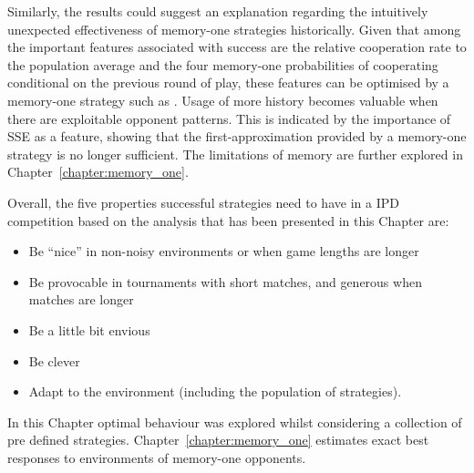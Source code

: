 Similarly, the results could suggest an explanation regarding the intuitively
unexpected effectiveness of memory-one strategies historically. Given that among
the important features associated with success are the relative cooperation rate
to the population average and the four memory-one probabilities of cooperating
conditional on the previous round of play, these features can be optimised by a
memory-one strategy such as \TitForTat. Usage of more history becomes valuable when
there are exploitable opponent patterns. This is indicated by the importance of
SSE as a feature, showing that the first-approximation provided by a memory-one
strategy is no longer sufficient. The limitations of memory are further explored
in Chapter~\ref{chapter:memory_one}.

Overall, the five properties successful strategies need to have in a IPD competition
based on the analysis that has been presented in this Chapter are:

\begin{itemize}
    \item Be ``nice'' in non-noisy environments or when game lengths are longer
    \item Be provocable in tournaments with short matches, and generous when matches are longer
    \item Be a little bit envious
    \item Be clever
    \item Adapt to the environment (including the population of strategies).
\end{itemize}

In this Chapter optimal behaviour was explored whilst considering a collection
of pre defined strategies. Chapter~\ref{chapter:memory_one} estimates
exact best responses to environments of memory-one opponents.
